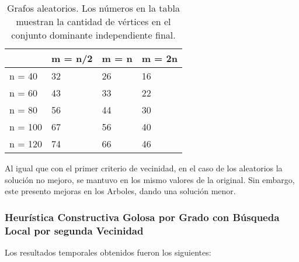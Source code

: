 \begin{table}[H]
\centering
\label{my-label}
\begin{tabular}{|l|lll|}
\hline
        & \multicolumn{1}{l|}{m = n/2} & \multicolumn{1}{l|}{m = n} & m = 2n \\ \hline
n = 40  & 32                           & 26                         & 16     \\ \cline{1-1}
n = 60  & 43                           & 33                         & 22     \\ \cline{1-1}
n = 80  & 56                           & 44                         & 30     \\ \cline{1-1}
n = 100 & 67                           & 56                         & 40     \\ \cline{1-1}
n = 120 & 74                           & 66                         & 46     \\ \hline
\end{tabular}
\caption{Grafos aleatorios. Los números en la tabla muestran la cantidad de vértices en el conjunto dominante independiente final.}
\end{table}

Al igual que con el primer criterio de vecinidad, en el caso de los aleatorios la solución no mejoro, se mantuvo en los mismo valores de la original. Sin embargo, este presento mejoras en los Arboles, dando una solución menor.

\subsubsection{Heurística Constructiva Golosa por Grado con Búsqueda Local por segunda Vecinidad}

Los resultados temporales obtenidos fueron los siguientes:

